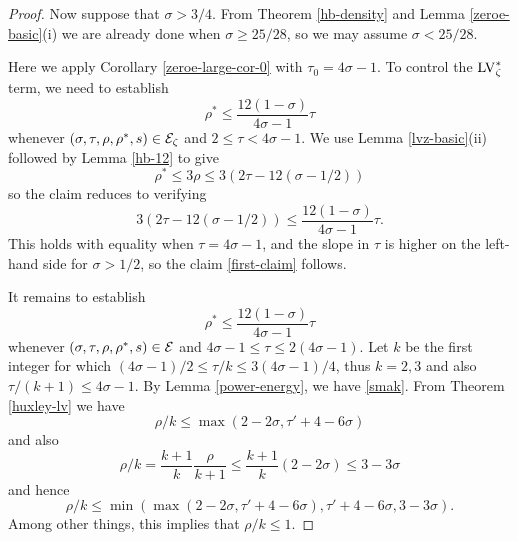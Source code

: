 \begin{proof}
Now suppose that $\sigma > 3/4$.  From Theorem \ref{hb-density} and Lemma \ref{zeroe-basic}(i) we are already done when $\sigma \geq 25/28$, so we may assume $\sigma < 25/28$.

Here we apply Corollary \ref{zeroe-large-cor-0} with $\tau_0 = 4\sigma-1$.  To control the $\mathrm{LV}^*_\zeta$ term, we need to establish
\begin{equation}\label{first-claim}
    \rho^* \leq \frac{12(1-\sigma)}{4\sigma-1} \tau
\end{equation}
whenever $(\sigma,\tau,\rho,\rho^*,s) \in \mathcal{E}_\zeta$ and $2 \leq \tau < 4\sigma-1$. We use Lemma \ref{lvz-basic}(ii) followed by Lemma \ref{hb-12} to give
$$ \rho^* \leq 3\rho \leq 3( 2\tau - 12 (\sigma-1/2) )$$
so the claim reduces to verifying
$$ 3( 2\tau - 12 (\sigma-1/2) ) \leq \frac{12(1-\sigma)}{4\sigma-1} \tau.$$
This holds with equality when $\tau = 4\sigma-1$, and the slope in $\tau$ is higher on the left-hand side for $\sigma>1/2$, so the claim \eqref{first-claim} follows.

It remains to establish
\begin{equation}\label{second-claim'}
    \rho^* \leq \frac{12(1-\sigma)}{4\sigma-1} \tau
\end{equation}
whenever $(\sigma,\tau,\rho,\rho^*,s) \in \mathcal{E}$ and $4\sigma-1 \leq \tau \leq 2(4\sigma-1)$.
Let $k$ be the first integer for which $(4\sigma-1)/2 \leq \tau/k \leq 3(4\sigma-1)/4$, thus $k=2,3$ and also $\tau/(k+1) \leq 4\sigma-1$.  By Lemma \ref{power-energy}, we have \eqref{smak}.
From Theorem \ref{huxley-lv} we have
$$\rho/k \leq \max(2-2\sigma, \tau' + 4 - 6\sigma)$$
and also
$$\rho/k = \frac{k+1}{k} \frac{\rho}{k+1} \leq \frac{k+1}{k} (2-2\sigma) \le 3-3\sigma$$
and hence
\begin{equation}\label{rhok} \rho/k \leq \min( \max(2-2\sigma, \tau' + 4 - 6\sigma), \tau'+4-6\sigma, 3-3\sigma).
\end{equation}
Among other things, this implies that $\rho/k \leq 1$.


\end{proof}
